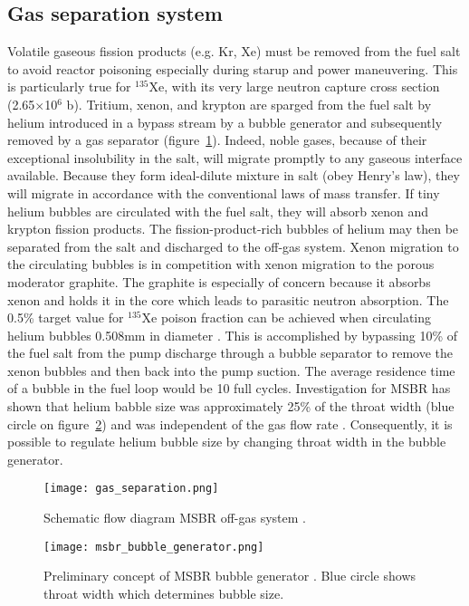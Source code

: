 \subsection{Gas separation system}
Volatile gaseous fission products (e.g. Kr, Xe) must be removed from the fuel salt 
to avoid reactor poisoning especially during starup and power maneuvering. This is 
particularly true for $^{135}$Xe, with its very large neutron capture cross section 
(2.65$\times$10$^6$ b). Tritium, xenon, and krypton are sparged from the fuel salt by 
helium introduced in a bypass stream by a bubble generator and subsequently removed 
by a gas separator (figure~\ref{fig:gas_removal_system}). Indeed, noble gases, because of their exceptional insolubility 
in the salt, will migrate promptly to any gaseous interface available. Because 
they form ideal-dilute mixture in salt (obey Henry's law), they will migrate in 
accordance with the conventional laws of mass transfer. If tiny helium bubbles 
are circulated with the fuel salt, they will absorb xenon and krypton fission 
products. The fission-product-rich bubbles of helium may then be separated from 
the salt and discharged to the off-gas system. Xenon migration to the circulating 
bubbles is in competition with xenon migration to the porous moderator graphite. 
The graphite is especially of concern because it absorbs xenon and holds it in the 
core which leads to parasitic neutron absorption. The 0.5\% target value for 
$^{135}$Xe poison fraction can be achieved when circulating helium bubbles 
0.508mm in diameter \cite{robertson_conceptual_1971}. This is accomplished by 
bypassing 10\% of the fuel salt from the pump discharge through a bubble separator 
to remove the xenon bubbles and then back into the pump suction. The average 
residence time of a bubble in the fuel loop would be 10 full cycles. Investigation 
for \gls{MSBR} has shown that helium babble size was approximately 25\% of the 
throat width (blue circle on figure~\ref{fig:bubble_separator}) and was independent 
of the gas flow rate \cite{robertson_conceptual_1971}. Consequently, it is possible 
to regulate helium bubble size by changing throat width in the bubble generator.
\begin{figure}[htp!] %
  \centering
  \texttt{[image: gas\_separation.png]}
  \caption{Schematic flow diagram \gls{MSBR} off-gas system 	\cite{robertson_conceptual_1971}.}
  \label{fig:gas_removal_system}
\end{figure}
\begin{figure}[htp!] %
  \centering
  \texttt{[image: msbr\_bubble\_generator.png]}
  \caption{Preliminary concept of \gls{MSBR} bubble generator  \cite{robertson_conceptual_1971}. Blue circle shows throat width which 
  determines bubble size.}
  \label{fig:bubble_separator}
\end{figure}


